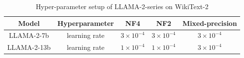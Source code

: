 \begin{table}[htb]
\caption{Hyper-parameter setup of {\OurAlg} LLAMA-2-series on WikiText-2}
\vspace{-5mm}
\label{tab:app_llama_wikitex}
\begin{center}
\begin{tabular}{c|c|ccc}
\toprule
\bf Model& {\bf Hyperparameter}&  {\bf NF4} & {\bf NF2}& {\bf Mixed-precision}  \\ 
\midrule 
LLAMA-2-7b&learning rate&$3\times 10^{-4}$&$3\times 10^{-4}$&$3\times 10^{-4}$ \\
\midrule
LLAMA-2-13b&learning rate&$1\times 10^{-4}$&$1\times 10^{-4}$&$3\times 10^{-4}$ \\
\bottomrule
\end{tabular}
\end{center}
\end{table}

